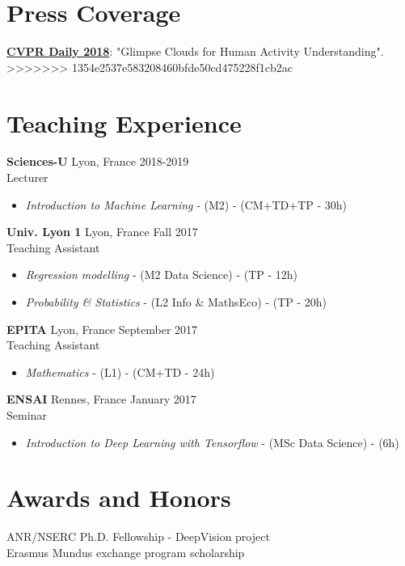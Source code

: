 \documentclass[10pt]{res} %
\begin{document}
\begin{resume}
\section{\large Press Coverage}
\href{https://www.rsipvision.com/CVPR2018-Tuesday/14/}{\textbf{CVPR Daily 2018}}: "Glimpse Clouds for Human Activity Understanding".
>>>>>>> 1354e2537e583208460bfde50cd475228f1cb2ac

\section{\large Teaching Experience}
\textbf{Sciences-U} \hfill Lyon, France \hfill 2018-2019 \\
Lecturer
\begin{itemize}
	\item \textit{Introduction to Machine Learning} - (M2) - (CM+TD+TP - 30h)
\end{itemize}

\textbf{Univ. Lyon 1} \hfill Lyon, France \hfill Fall 2017 \\
Teaching Assistant
\begin{itemize}
	\item \textit{Regression modelling}  - (M2 Data Science) - (TP - 12h)
	\item \textit{Probability \& Statistics}  - (L2 Info \& MathsEco) - (TP - 20h)
\end{itemize}

\textbf{EPITA} \hfill Lyon, France \hfill September 2017 \\
Teaching Assistant
\begin{itemize}
	\item \textit{Mathematics} - (L1) - (CM+TD - 24h)
\end{itemize}

\textbf{ENSAI} \hfill Rennes, France \hfill January 2017 \\
Seminar
\begin{itemize}
\item \textit{Introduction to Deep Learning with Tensorflow} - (MSc Data Science) - (6h)
\end{itemize}


\section{\large Awards and Honors} 
ANR/NSERC Ph.D. Fellowship - DeepVision project \\
Erasmus Mundus exchange program scholarship


\end{resume}
\end{document}
